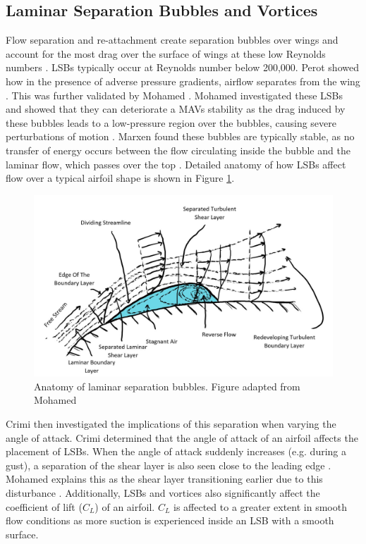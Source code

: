 \subsection{Laminar Separation Bubbles and Vortices}
Flow separation and re-attachment create separation bubbles over wings and account for the most drag over the surface of wings at these low Reynolds numbers \cite{ravi}. \acrshort{LSB}s typically occur at Reynolds number below 200,000. Perot showed how in the presence of adverse pressure gradients, airflow separates from the wing \cite{Perot1999}. This was further validated by Mohamed \cite{Mohamed2014}. Mohamed investigated these \acrshort{LSB}s and showed that they can deteriorate a \acrshort{MAV}s stability as the drag induced by these bubbles leads to a low-pressure region over the bubbles, causing severe perturbations of motion \cite{Mohamed2014}. Marxen found these bubbles are typically stable, as no transfer of energy occurs between the flow circulating inside the bubble and the laminar flow, which passes over the top \cite{Marxen2010}. Detailed anatomy of how \acrshort{LSB}s affect flow over a typical airfoil shape is shown in Figure \ref{fig:Laminar}.


\begin{figure}[H]
  \centering
   \includegraphics[width=\linewidth]{03_LiteratureReview/Figs/LSB.jpg}
  \caption{Anatomy of laminar separation bubbles. Figure adapted from Mohamed \cite{Mohamed2014}}
  \label{fig:Laminar}
\end{figure}

Crimi then investigated the implications of this separation when varying the angle of attack. Crimi determined that the angle of attack of an airfoil affects the placement of \acrshort{LSB}s. When the angle of attack suddenly increases (e.g. during a gust), a separation of the shear layer is also seen close to the leading edge \cite{Crimi1976}. Mohamed explains this as the shear layer transitioning earlier due to this disturbance  \cite{Mohamed2014}. Additionally, \acrshort{LSB}s and vortices also significantly affect the coefficient of lift ($C_L$) of an airfoil. $C_L$ is affected to a greater extent in smooth flow conditions as more suction is experienced inside an \acrshort{LSB} with a smooth surface.



